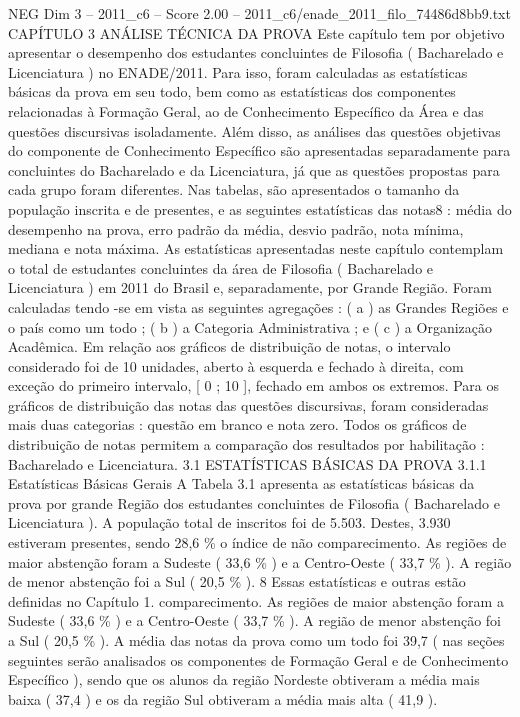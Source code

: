 \begin{textsample}{NEG Dim 3 – 2011\_c6 – Score 2.00 – 2011\_c6/enade\_2011\_filo\_74486d8bb9.txt}  \label{ex:f3_neg_083}
CAPÍTULO 3 ANÁLISE TÉCNICA DA PROVA Este capítulo tem por objetivo apresentar o desempenho dos estudantes concluintes de Filosofia ( Bacharelado e Licenciatura ) no ENADE/2011.
Para isso, foram calculadas as estatísticas básicas da prova em seu todo, bem como as estatísticas dos componentes relacionadas à Formação Geral, ao de Conhecimento Específico da Área e das questões discursivas isoladamente.
Além disso, as análises das questões objetivas do componente de Conhecimento Específico são apresentadas separadamente para concluintes do Bacharelado e da Licenciatura, já que as questões propostas para cada grupo foram diferentes.
Nas tabelas, são apresentados o tamanho da população inscrita e de presentes, e as seguintes estatísticas das notas8 : média do desempenho na prova, erro padrão da média, desvio padrão, nota mínima, mediana e nota máxima.
As estatísticas apresentadas neste capítulo contemplam o total de estudantes concluintes da área de Filosofia ( Bacharelado e Licenciatura ) em 2011 do Brasil e, separadamente, por Grande Região.
Foram calculadas tendo -se em vista as seguintes agregações : ( a ) as Grandes Regiões e o país como um todo ; ( b ) a Categoria Administrativa ; e ( c ) a Organização Acadêmica.
Em relação aos gráficos de distribuição de notas, o intervalo considerado foi de 10 unidades, aberto à esquerda e fechado à direita, com exceção do primeiro intervalo, [ 0 ; 10 ], fechado em ambos os extremos.
Para os gráficos de distribuição das notas das questões discursivas, foram consideradas mais duas categorias : questão em branco e nota zero.
Todos os gráficos de distribuição de notas permitem a comparação dos resultados por habilitação : Bacharelado e Licenciatura. 3.1 ESTATÍSTICAS BÁSICAS DA PROVA 3.1.1 Estatísticas Básicas Gerais A Tabela 3.1 apresenta as estatísticas básicas da prova por grande Região dos estudantes concluintes de Filosofia ( Bacharelado e Licenciatura ).
A população total de inscritos foi de 5.503.
Destes, 3.930 estiveram presentes, sendo 28,6 \% o índice de não comparecimento.
As regiões de maior abstenção foram a Sudeste ( 33,6 \% ) e a Centro-Oeste ( 33,7 \% ).
A região de menor abstenção foi a Sul ( 20,5 \% ). 8 Essas estatísticas e outras estão definidas no Capítulo 1. comparecimento.
As regiões de maior abstenção foram a Sudeste ( 33,6 \% ) e a Centro-Oeste ( 33,7 \% ).
A região de menor abstenção foi a Sul ( 20,5 \% ).
A média das notas da prova como um todo foi 39,7 ( nas seções seguintes serão analisados os componentes de Formação Geral e de Conhecimento Específico ), sendo que os alunos da região Nordeste obtiveram a média mais baixa ( 37,4 ) e os da região Sul obtiveram a média mais alta ( 41,9 ).

\end{textsample}
